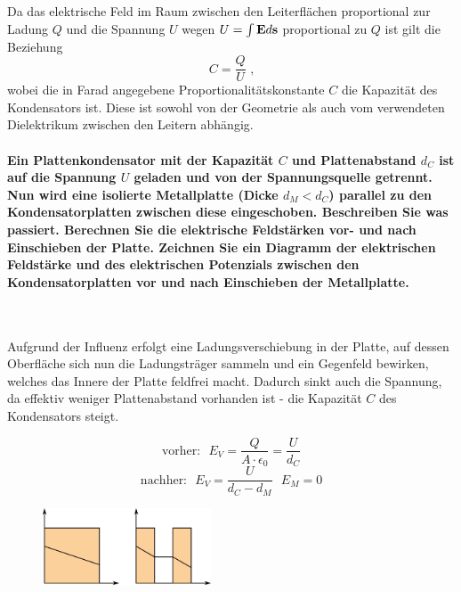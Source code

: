 \documentclass[a4paper, 11pt, parskip=half]{scrartcl}
\begin{document}
Da das elektrische Feld im Raum zwischen den Leiterflächen proportional zur Ladung $Q$ und die
Spannung $U$ wegen $U = \int \bold{E} d\bold{s}$ proportional zu $Q$ ist gilt die Beziehung
\begin{equation}
    C = \frac{Q}{U} \text{ ,}
\end{equation}
wobei die in Farad angegebene Proportionalitätskonstante $C$ die Kapazität des Kondensators ist.
Diese ist sowohl von der Geometrie als auch vom verwendeten Dielektrikum zwischen den Leitern
abhängig.

\paragraph{Ein Plattenkondensator mit der Kapazität $C$ und Plattenabstand $d_C$ ist auf die Spannung
$U$ geladen und von der Spannungsquelle getrennt. Nun wird eine isolierte Metallplatte (Dicke
$d_M<d_C$) parallel zu den Kondensatorplatten zwischen diese eingeschoben. Beschreiben Sie was
passiert. Berechnen Sie die elektrische Feldstärken vor- und nach Einschieben der Platte. Zeichnen
Sie ein Diagramm der elektrischen Feldstärke und des elektrischen Potenzials zwischen den
Kondensatorplatten vor und nach Einschieben der Metallplatte.} ~

Aufgrund der Influenz erfolgt eine Ladungsverschiebung in der Platte, auf dessen Oberfläche sich nun
die Ladungsträger sammeln und ein Gegenfeld bewirken, welches das Innere der Platte feldfrei macht.
Dadurch sinkt auch die Spannung, da effektiv weniger Plattenabstand vorhanden ist - die Kapazität
$C$ des Kondensators steigt.

\begin{equation}
    \text{vorher:} ~~~
    E_V = \frac{Q}{A \cdot \epsilon_0} = \frac{U}{d_C}
\end{equation}
\begin{equation}
    \text{nachher:} ~~~
    E_V = \frac{U}{d_C - d_M} ~~~
    E_M = 0
\end{equation}

\begin{figure}[H]
    \centering
    \includegraphics[width=5cm]{image/2/3}
\end{figure}
\end{document}

